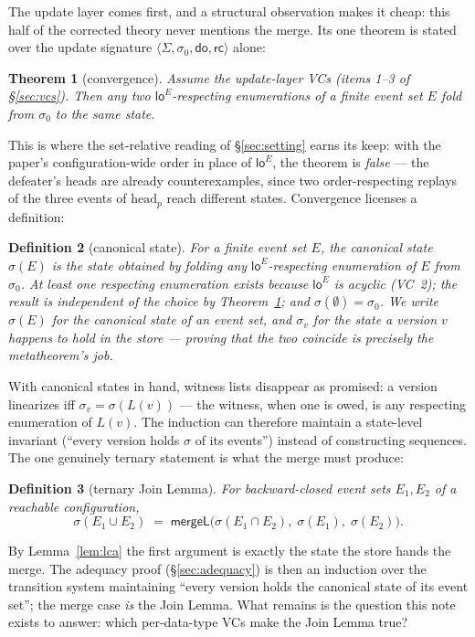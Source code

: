 \documentclass[11pt]{article}
\newtheorem{theorem}{Theorem}[section]
\newtheorem{definition}[theorem]{Definition}
\newcommand{\mergeL}{\mathsf{mergeL}}
\newcommand{\Sinit}{\sigma_0}
\newcommand{\loE}[1]{\mathsf{lo}^{#1}}
\begin{document}
The update layer comes first, and a structural observation makes it
cheap: this half of the corrected theory never mentions the merge. Its
one theorem is stated over the update signature $\langle \Sigma, \Sinit,
\mathsf{do}, \mathsf{rc}\rangle$ alone:

\begin{theorem}[convergence]
\label{thm:conv}
Assume the update-layer VCs (items 1--3 of \S\ref{sec:vcs}). Then any
two $\loE{E}$-respecting enumerations of a finite event set $E$ fold
from $\Sinit$ to the same state.
\end{theorem}

This is where the set-relative reading of \S\ref{sec:setting} earns
its keep: with the paper's configuration-wide order in place of
$\loE{E}$, the theorem is \emph{false} --- the defeater's heads are
already counterexamples, since two order-respecting replays of the
three events of $\mathrm{head}_p$ reach different states. Convergence
licenses a definition:

\begin{definition}[canonical state]
\label{def:sigma}
For a finite event set $E$, the \emph{canonical state} $\sigma(E)$ is
the state obtained by folding any $\loE{E}$-respecting enumeration of
$E$ from $\Sinit$. At least one respecting enumeration exists because
$\loE{E}$ is acyclic (VC~2); the result is independent of the choice by
Theorem~\ref{thm:conv}; and $\sigma(\emptyset) = \Sinit$. We write
$\sigma(E)$ for the canonical state of an event set, and $\sigma_v$ for
the state a version $v$ happens to hold in the store --- proving that
the two coincide is precisely the metatheorem's job.
\end{definition}

With canonical states in hand, witness lists disappear as promised: a
version linearizes iff $\sigma_v = \sigma(L(v))$ --- the witness, when
one is owed, is any respecting enumeration of $L(v)$. The induction can
therefore maintain a state-level invariant (``every version holds
$\sigma$ of its events'') instead of constructing sequences. The one
genuinely ternary statement is what the merge must produce:

\begin{definition}[ternary Join Lemma]
For backward-closed event sets $E_1, E_2$ of a reachable configuration,
\[
  \sigma(E_1 \cup E_2)
  \;=\;
  \mergeL\bigl(\sigma(E_1 \cap E_2),\; \sigma(E_1),\; \sigma(E_2)\bigr).
\]
\end{definition}

By Lemma~\ref{lem:lca} the first argument is exactly the state the store
hands the merge. The adequacy proof (\S\ref{sec:adequacy}) is then an
induction over the transition system maintaining ``every version holds the
canonical state of its event set''; the merge case \emph{is} the Join
Lemma. What remains is the question this note exists to answer: which
per-data-type VCs make the Join Lemma true?
\end{document}
